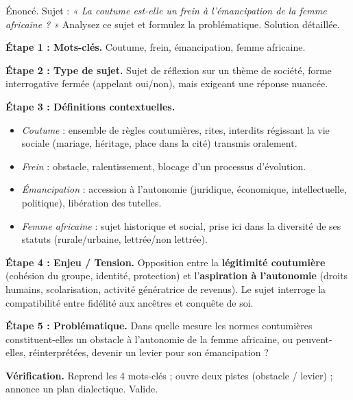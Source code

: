 \documentclass[11pt]{article}
\newcommand{\cle}[1]{{\popxbold\color{popdark}#1}}
\newcounter{popsec}
\newcounter{popsub}
\newcommand{\courssub}[1]{%
  \stepcounter{popsub}%
  \par\vspace{9pt}\noindent{\popxbold\fontsize{11.5}{13}\selectfont\color{popink}{\color{poporange}\thepopsec.\thepopsub}\hspace{6pt}#1}\par\nopagebreak\vspace{4pt}
}
\begin{document}
\begin{exoresolu}
Énoncé. Sujet : \emph{« La coutume est-elle un frein à l'émancipation de la femme africaine ? »} Analysez ce sujet et formulez la problématique.
\tcblower
Solution détaillée.

\textbf{Étape 1 : Mots-clés.} \cle{Coutume}, \cle{frein}, \cle{émancipation}, \cle{femme africaine}.

\textbf{Étape 2 : Type de sujet.} Sujet de réflexion sur un thème de société, forme interrogative fermée (appelant oui/non), mais exigeant une réponse nuancée.

\textbf{Étape 3 : Définitions contextuelles.}
\begin{itemize}
\item \emph{Coutume} : ensemble de règles coutumières, rites, interdits régissant la vie sociale (mariage, héritage, place dans la cité) transmis oralement.
\item \emph{Frein} : obstacle, ralentissement, blocage d'un processus d'évolution.
\item \emph{Émancipation} : accession à l'autonomie (juridique, économique, intellectuelle, politique), libération des tutelles.
\item \emph{Femme africaine} : sujet historique et social, prise ici dans la diversité de ses statuts (rurale/urbaine, lettrée/non lettrée).
\end{itemize}

\textbf{Étape 4 : Enjeu / Tension.} Opposition entre la \textbf{légitimité coutumière} (cohésion du groupe, identité, protection) et l'\textbf{aspiration à l'autonomie} (droits humains, scolarisation, activité génératrice de revenus). Le sujet interroge la compatibilité entre fidélité aux ancêtres et conquête de soi.

\textbf{Étape 5 : Problématique.} \og Dans quelle mesure les normes coutumières constituent-elles un obstacle à l'autonomie de la femme africaine, ou peuvent-elles, réinterprétées, devenir un levier pour son émancipation ? \fg

\textbf{Vérification.} Reprend les 4 mots-clés ; ouvre deux pistes (obstacle / levier) ; annonce un plan dialectique. Valide.
\end{exoresolu}

\courssub{Formuler la problématique}
\end{document}
